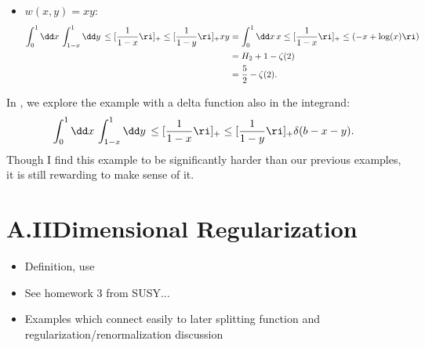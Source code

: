\begin{example}
\begin{itemize}
    \item
        \(w(x,y) = x y\):
        \begin{align}
            \int_{0}^{1} \dd x\,
            \int_{1-x}^{1} \dd y\,
            \le[\frac{1}{1-x}\ri]_+
            \le[\frac{1}{1-y}\ri]_+
            x y
            &=
            \int_{0}^{1} \dd x\,x
            \le[\frac{1}{1-x}\ri]_+
            \le(-x + \log(x)\ri)
            \\
            &=
            H_2 + 1 - \zeta(2)
            \notag
            \\
            &=
            \frac{5}{2} - \zeta(2)
            \notag
            .
        \end{align}
\end{itemize}
\end{example}



In , we explore the example with a delta function also in the integrand:
\begin{align}
    \int_{0}^{1} \dd x\,
    \int_{1-x}^{1} \dd y\,
    \le[\frac{1}{1-x}\ri]_+
    \le[\frac{1}{1-y}\ri]_+
    \delta(b - x - y)
    \label{eq:two-plus_one-delta}
    .
\end{align}
%
Though I find this example to be significantly harder than our previous examples, it is still rewarding to make sense of it.





\section*{A.II\phantom{IV.}Dimensional Regularization}
\setcounter{section}{2}

\begin{itemize}
    \item
        Definition, use

    \item
        See homework 3 from SUSY...

    \item
        Examples which connect easily to later splitting function and regularization/renormalization discussion
\end{itemize}



